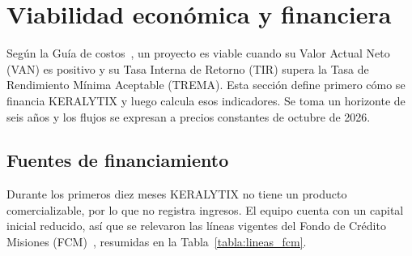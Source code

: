 \section{Viabilidad económica y financiera}
\label{sec:viabilidad_economica}

    Según la Guía de costos~\cite{guia_costos}, un proyecto es viable cuando su Valor Actual Neto (VAN) es positivo y su Tasa Interna de Retorno (TIR) supera la Tasa de Rendimiento Mínima Aceptable (TREMA). Esta sección define primero cómo se financia KERALYTIX y luego calcula esos indicadores. Se toma un horizonte de seis años y los flujos se expresan a precios constantes de octubre de 2026.

    \subsection{Fuentes de financiamiento}

        Durante los primeros diez meses KERALYTIX no tiene un producto comercializable, por lo que no registra ingresos. El equipo cuenta con un capital inicial reducido, así que se relevaron las líneas vigentes del Fondo de Crédito Misiones (FCM)~\cite{fcm_faq,fcm_lineas}, resumidas en la Tabla~\ref{tabla:lineas_fcm}.

